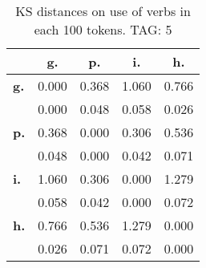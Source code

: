 \begin{table}[h!]
\begin{center}
\begin{tabular}{| l || c | c | c | c |}\hline
 & {\bf g.} & {\bf p.} & {\bf i.} & {\bf h.} \\\hline\hline
{\bf g.} & 0.000 & 0.368 & 1.060 & 0.766 \\
{\bf } & 0.000 & 0.048 & 0.058 & 0.026 \\\hline
{\bf p.} & 0.368 & 0.000 & 0.306 & 0.536 \\
{\bf } & 0.048 & 0.000 & 0.042 & 0.071 \\\hline
{\bf i.} & 1.060 & 0.306 & 0.000 & 1.279 \\
{\bf } & 0.058 & 0.042 & 0.000 & 0.072 \\\hline
{\bf h.} & 0.766 & 0.536 & 1.279 & 0.000 \\
{\bf } & 0.026 & 0.071 & 0.072 & 0.000 \\\hline
\end{tabular}
\caption{KS distances on use of verbs in each 100 tokens. TAG: 5}
\end{center}
\end{table}